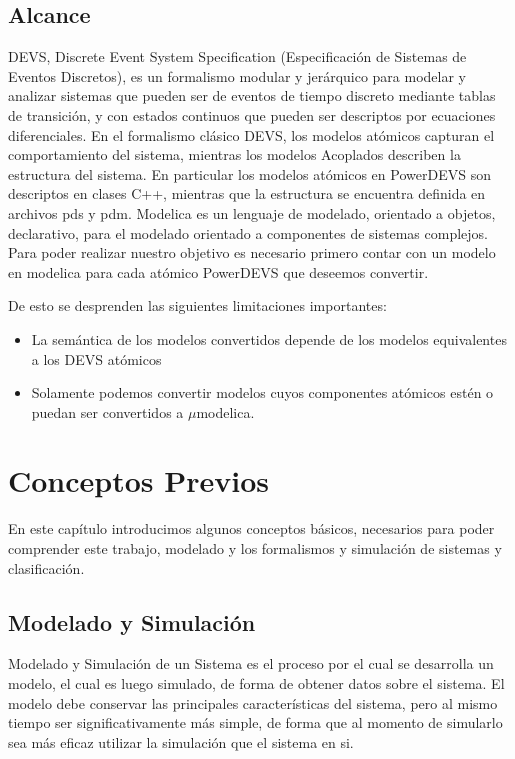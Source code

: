 \documentclass[a4paper,	11pt]{report}
\begin{document}
\section{Alcance}
DEVS\cite{Zeigler:2000:TMS:580780}, Discrete Event System Specification (Especificación de Sistemas de Eventos Discretos), es un formalismo modular y jerárquico para modelar y analizar sistemas que pueden ser de eventos de tiempo discreto mediante tablas de transición, y con estados continuos que pueden ser descriptos por ecuaciones diferenciales.
En el formalismo clásico DEVS, los modelos atómicos capturan el comportamiento del sistema, mientras los modelos Acoplados describen la estructura del sistema.
En particular los modelos atómicos en PowerDEVS son descriptos en clases C++, mientras que la estructura se encuentra definida en archivos pds y pdm.
Modelica es un lenguaje de modelado, orientado a objetos, declarativo, para el modelado orientado a componentes de sistemas complejos.
Para poder realizar nuestro objetivo es necesario primero contar con un modelo  en modelica\cite{Fritzson02modelica--} para cada atómico PowerDEVS\cite{BK11} que deseemos convertir. 

De esto se desprenden las siguientes limitaciones importantes:
\begin{itemize}
	\item La semántica de los modelos convertidos depende de los modelos equivalentes a los DEVS atómicos 
	\item Solamente podemos convertir modelos cuyos componentes atómicos estén o puedan ser convertidos a $\mu$modelica.
\end{itemize}

	
\chapter{Conceptos Previos}
En este capítulo introducimos algunos conceptos básicos, necesarios para poder comprender este trabajo, modelado y los formalismos y simulación de sistemas y clasificación.

\section{Modelado y Simulación}
Modelado y Simulación de un Sistema es el proceso por el cual se desarrolla un modelo, el cual es luego simulado, de forma de obtener datos sobre el sistema. El modelo debe conservar las principales características del sistema, pero al mismo tiempo ser significativamente más simple, de forma que al momento de simularlo sea más eficaz utilizar la simulación que el sistema en si.
\end{document}
